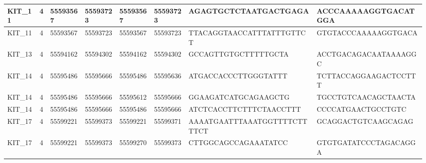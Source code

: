 \begin{landscape}
\begin{longtable}{| p{} | p{} | p{} | p{} | p{} | p{} | p{} | p{} |}
\multicolumn{1}{|l|}{KIT\_11}    & \multicolumn{1}{c|}{4}  & \multicolumn{1}{l|}{55593567}  & \multicolumn{1}{l|}{55593723}  & \multicolumn{1}{l|}{55593567}  & \multicolumn{1}{l|}{55593723}  & \multicolumn{1}{l|}{AGAGTGCTCTAATGACTGAGA}           & \multicolumn{1}{l|}{ACCCAAAAAGGTGACATGGA}          \\ \hline
\multicolumn{1}{|l|}{KIT\_11}    & \multicolumn{1}{c|}{4}  & \multicolumn{1}{l|}{55593567}  & \multicolumn{1}{l|}{55593723}  & \multicolumn{1}{l|}{55593567}  & \multicolumn{1}{l|}{55593723}  & \multicolumn{1}{l|}{TTACAGGTAACCATTTATTTGTTCT}       & \multicolumn{1}{l|}{GTGTACCCAAAAAGGTGACA}          \\ \hline
\multicolumn{1}{|l|}{KIT\_13}    & \multicolumn{1}{c|}{4}  & \multicolumn{1}{l|}{55594162}  & \multicolumn{1}{l|}{55594302}  & \multicolumn{1}{l|}{55594162}  & \multicolumn{1}{l|}{55594302}  & \multicolumn{1}{l|}{GCCAGTTGTGCTTTTTGCTA}            & \multicolumn{1}{l|}{ACCTGACAGACAATAAAAGGC}         \\ \hline
\multicolumn{1}{|l|}{KIT\_14}    & \multicolumn{1}{c|}{4}  & \multicolumn{1}{l|}{55595486}  & \multicolumn{1}{l|}{55595666}  & \multicolumn{1}{l|}{55595486}  & \multicolumn{1}{l|}{55595636}  & \multicolumn{1}{l|}{ATGACCACCCTTGGGTATTT}            & \multicolumn{1}{l|}{TCTTACCAGGAAGACTCCTTT}         \\ \hline
\multicolumn{1}{|l|}{KIT\_14}    & \multicolumn{1}{c|}{4}  & \multicolumn{1}{l|}{55595486}  & \multicolumn{1}{l|}{55595666}  & \multicolumn{1}{l|}{55595612}  & \multicolumn{1}{l|}{55595666}  & \multicolumn{1}{l|}{GGAAGATCATGCAGAAGCTG}            & \multicolumn{1}{l|}{TGCCTGTCAACAGCTAACTA}          \\ \hline
\multicolumn{1}{|l|}{KIT\_14}    & \multicolumn{1}{c|}{4}  & \multicolumn{1}{l|}{55595486}  & \multicolumn{1}{l|}{55595666}  & \multicolumn{1}{l|}{55595486}  & \multicolumn{1}{l|}{55595666}  & \multicolumn{1}{l|}{ATCTCACCTTCTTTCTAACCTTT}         & \multicolumn{1}{l|}{CCCCATGAACTGCCTGTC}            \\ \hline
\multicolumn{1}{|l|}{KIT\_17}    & \multicolumn{1}{c|}{4}  & \multicolumn{1}{l|}{55599221}  & \multicolumn{1}{l|}{55599373}  & \multicolumn{1}{l|}{55599221}  & \multicolumn{1}{l|}{55599371}  & \multicolumn{1}{l|}{AAAATGAATTTAAATGGTTTTCTTTTCT}    & \multicolumn{1}{l|}{GCAGGACTGTCAAGCAGAG}           \\ \hline
\multicolumn{1}{|l|}{KIT\_17}    & \multicolumn{1}{c|}{4}  & \multicolumn{1}{l|}{55599221}  & \multicolumn{1}{l|}{55599373}  & \multicolumn{1}{l|}{55599270}  & \multicolumn{1}{l|}{55599373}  & \multicolumn{1}{l|}{CTTGGCAGCCAGAAATATCC}            & \multicolumn{1}{l|}{GTGTGATATCCCTAGACAGGA}         \\ \hline

\end{longtable}
\end{landscape}
